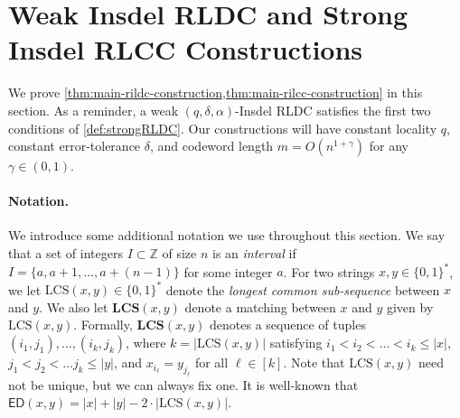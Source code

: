 \documentclass[10pt,a4paper]{article}
\theoremstyle{remark}
\newcommand{\eg}{\text{e.g.}\xspace}
\newcommand{\zo}{\ensuremath{{\{0,1\}}}\xspace}
\newcommand{\ED}{\ensuremath{\mathsf{ED}}\xspace}%
\newcommand{\superscript}[1]{\ensuremath{^{\mbox{\tiny{\textit{#1}}}}}\xspace}
\def \th {\superscript{th}}     %
\newcommand{\authnote}[3]{\textcolor{#2}{{\sf (#1's Note: {\sl{#3}})}}}
\newcommand{\jeremiah}{\authnote{Jeremiah}{blue}}
\newcommand{\alex}[1]{\authnote{Alex}{orange}{#1}}
\newcommand{\authnote}{}
\newcommand{\jeremiah}[1]{}
\newcommand{\alex}[1]{}
\newcommand{\lcs}{\ensuremath{\mathrm{LCS}}\xspace}
\newcommand{\LCS}{\ensuremath{\mathbf{LCS}}\xspace}
\begin{document}
\section{Weak Insdel RLDC and Strong Insdel RLCC Constructions}\label{sec:wrLDC}
% 
We prove \cref{thm:main-rildc-construction,thm:main-rilcc-construction} in this section.
As a reminder, a weak $(q, \delta, \alpha)$-Insdel RLDC satisfies the first two conditions of \cref{def:strongRLDC}.
Our constructions will have constant locality $q$, constant error-tolerance $\delta$, and codeword length $m = O(n^{1+\gamma})$ for any $\gamma \in (0,1)$.

\paragraph{Notation.}
We introduce some additional notation we use throughout this section.
We say that a set of integers $I \subset \mathbb{Z}$ of size $n$ is an \emph{interval} if $I = \{a, a+1, \dotsc, a+(n-1)\}$ for some integer $a$.
For two strings $x, y \in \zo^*$, we let $\lcs(x,y) \in \zo^*$ denote the \emph{longest common sub-sequence} between $x$ and $y$. 
We also let $\LCS(x,y)$ denote a matching between $x$ and $y$ given by $\lcs(x,y)$. 
Formally, $\LCS(x,y)$ denotes a sequence of tuples $(i_1, j_1), \dotsc, (i_k, j_k)$, where $k = |\lcs(x,y)|$ satisfying $i_1 < i_2 < \dotsc < i_k \leq |x|$, $j_1 < j_2 < \dotsc j_k \leq |y|$, and $x_{i_\ell} = y_{j_\ell}$ for all $\ell \in [k]$.
Note that $\lcs(x,y)$ need not be unique, but we can always fix one.
It is well-known that $\ED(x,y) = |x| + |y| - 2 \cdot |\lcs(x,y)|$. 
\end{document}
